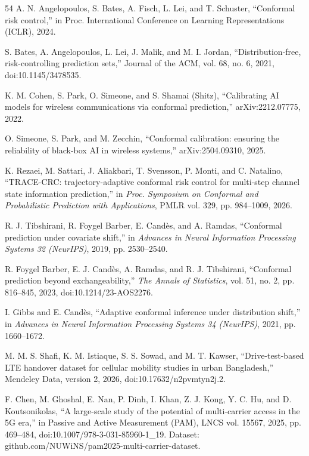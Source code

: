 \begin{thebibliography}{54}
 A. N. Angelopoulos, S. Bates, A. Fisch, L. Lei, and T. Schuster, ``Conformal risk control,'' in Proc. International Conference on Learning Representations (ICLR), 2024.

 S. Bates, A. Angelopoulos, L. Lei, J. Malik, and M. I. Jordan, ``Distribution-free, risk-controlling prediction sets,'' Journal of the ACM, vol. 68, no. 6, 2021, doi:10.1145/3478535.

 K. M. Cohen, S. Park, O. Simeone, and S. Shamai (Shitz), ``Calibrating AI models for wireless communications via conformal prediction,'' arXiv:2212.07775, 2022.

 O. Simeone, S. Park, and M. Zecchin, ``Conformal calibration: ensuring the reliability of black-box AI in wireless systems,'' arXiv:2504.09310, 2025.

 K. Rezaei, M. Sattari, J. Aliakbari, T. Svensson, P. Monti, and C. Natalino, ``TRACE-CRC: trajectory-adaptive conformal risk control for multi-step channel state information prediction,'' in \textit{Proc. Symposium on Conformal and Probabilistic Prediction with Applications}, PMLR vol. 329, pp. 984--1009, 2026.

 R. J. Tibshirani, R. Foygel Barber, E. Cand\`es, and A. Ramdas, ``Conformal prediction under covariate shift,'' in \textit{Advances in Neural Information Processing Systems 32 (NeurIPS)}, 2019, pp. 2530--2540.

 R. Foygel Barber, E. J. Cand\`es, A. Ramdas, and R. J. Tibshirani, ``Conformal prediction beyond exchangeability,'' \textit{The Annals of Statistics}, vol. 51, no. 2, pp. 816--845, 2023, doi:10.1214/23-AOS2276.

 I. Gibbs and E. Cand\`es, ``Adaptive conformal inference under distribution shift,'' in \textit{Advances in Neural Information Processing Systems 34 (NeurIPS)}, 2021, pp. 1660--1672.

 M. M. S. Shafi, K. M. Istiaque, S. S. Sowad, and M. T. Kawser, ``Drive-test-based LTE handover dataset for cellular mobility studies in urban Bangladesh,'' Mendeley Data, version 2, 2026, doi:10.17632/n2pvmtyn2j.2.

 F. Chen, M. Ghoshal, E. Nan, P. Dinh, I. Khan, Z. J. Kong, Y. C. Hu, and D. Koutsonikolas, ``A large-scale study of the potential of multi-carrier access in the 5G era,'' in Passive and Active Measurement (PAM), LNCS vol. 15567, 2025, pp. 469--484, doi:10.1007/978-3-031-85960-1\_19. Dataset: github.com/NUWiNS/pam2025-multi-carrier-dataset.


\end{thebibliography}
